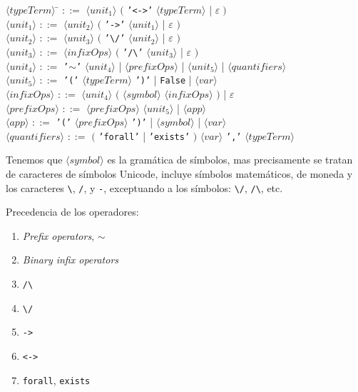 \documentclass[a4paper,11pt]{article}
\theoremstyle{definition}
\theoremstyle{remark}
\begin{document}
\begin{tabbing}

$\langle typeTerm \rangle$ \hspace{0.3cm} \= $::=$ $\langle unit_{1} \rangle$ $\Big($ \texttt{'<->'} $\langle typeTerm \rangle$ | $\varepsilon \; \Big)$\\
$\langle unit_{1} \rangle$ \> $::=$ $\langle unit_{2} \rangle$ $\Big($ \texttt{'->'} $\langle unit_{1} \rangle$ | $\varepsilon$ $\Big)$ \\
$\langle unit_{2} \rangle$ \> $::=$ $\langle unit_{3} \rangle$ $\Big($ \texttt{'\textbackslash/'} $\langle unit_{2} \rangle$ 
| $\varepsilon$ $\Big)$ \\
$\langle unit_{3} \rangle$ \> $::=$ $\langle infixOps \rangle$ $\Big($ \texttt{'/\textbackslash'} $\langle unit_{3} \rangle$ 
| $\varepsilon$ $\Big)$ \\
$\langle unit_{4} \rangle$ \> $::=$ \texttt{'$\sim$'} $\langle unit_{4} \rangle$ 
| $\langle prefixOps \rangle$ | $\langle unit_{5} \rangle$ | $\langle quantifiers \rangle$\\
$\langle unit_{5} \rangle$ \> $::=$ \texttt{'('} $\langle typeTerm \rangle$ \texttt{')'} | \texttt{False} | $\langle var \rangle$  \\
$\langle infixOps \rangle$ \> $::=$ $\langle unit_{4} \rangle$ $\Big($ $\langle symbol \rangle$ $\langle infixOps \rangle$ $\Big)$ 
| $\varepsilon$\\
$\langle prefixOps \rangle$ \> $::=$ $\langle prefixOps \rangle$ $\langle unit_{5} \rangle$ | $\langle app \rangle$\\
$\langle app \rangle$ \> $::=$ \texttt{'('} $\langle prefixOps \rangle$ \texttt{')'} | $\langle symbol \rangle$ | $\langle var \rangle$ \\
$\langle quantifiers \rangle$ \> $::=$ $\Big($ \texttt{'forall'} | \texttt{'exists'} $\Big)$ $\langle var \rangle$ \texttt{','} $\langle typeTerm \rangle$ \\
\end{tabbing}

Tenemos que $\langle symbol \rangle$ es la gramática de símbolos, mas precisamente se tratan de caracteres de símbolos Unicode, 
incluye símbolos matemáticos, de moneda y los caracteres \texttt{\textbackslash}, \texttt{/}, y \texttt{-}, exceptuando a los
símbolos: \texttt{\textbackslash/}, \texttt{/\textbackslash}, etc.

Precedencia de los operadores:

\begin{enumerate}

\item \textit{Prefix operators}, $\mathtt{\sim}$
\item \textit{Binary infix operators}
\item \texttt{/\textbackslash}
\item \texttt{\textbackslash/}
\item \texttt{->}
\item \texttt{<->}
\item \texttt{forall}, \texttt{exists} 

\end{enumerate}
\end{document}
